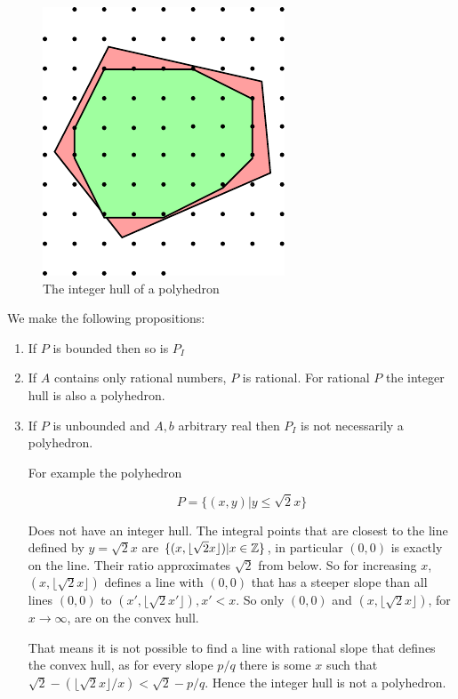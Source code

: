 \begin{figure}[hbt]
\begin{center}
\includegraphics{./images/integerHull}
\end{center}
\caption{The integer hull of a polyhedron}
\label{Fig:integerHull}
\end{figure}

We make the following propositions:

\begin{enumerate}
\item If $P$ is bounded then so is $P_I$
\item If $A$ contains only rational numbers, $P$ is rational. For rational $P$ the integer hull is also a polyhedron.
\item If $P$ is unbounded and $A,b$ arbitrary real then $P_I$ is not necessarily a polyhedron.

For example the polyhedron

\[P=\{(x,y)|y\leq \sqrt{2} x\}\]

Does not have an integer hull. The integral points that are closest to the line defined by $y=\sqrt 2 x$ are $\{(x,\lfloor \sqrt 2 x\rfloor)|x\in \mathbb{Z}\}$, in particular $(0,0)$ is exactly on the line. Their ratio approximates $\sqrt 2$ from below. So for increasing $x$, $(x,\lfloor \sqrt 2 x \rfloor)$ defines a line with $(0,0)$ that has a steeper slope than all lines $(0,0)$ to $(x',\lfloor \sqrt 2 x' \rfloor), x'<x$. So only $(0,0)$ and $(x,\lfloor \sqrt 2 x \rfloor)$, for $x\rightarrow \infty$, are on the convex hull.

That means it is not possible to find a line with rational slope that defines the convex hull, as for every slope $p/q$ there is some $x$ such that $\sqrt 2 - (\lfloor \sqrt 2 x \rfloor/x) < \sqrt 2 - p/q$. Hence the integer hull is not a polyhedron.
\end{enumerate}


